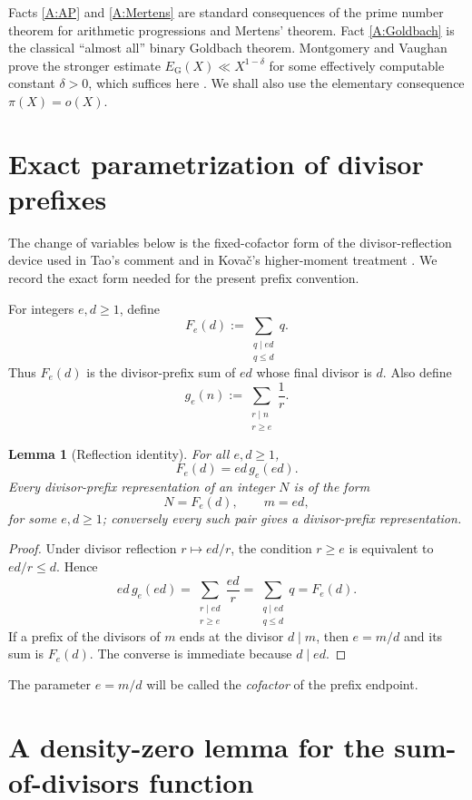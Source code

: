 \documentclass[11pt]{article}
\newtheorem{lemma}[theorem]{Lemma}
\theoremstyle{definition}
\theoremstyle{remark}
\begin{document}
Facts \ref{A:AP} and \ref{A:Mertens} are standard consequences of the prime number theorem for arithmetic progressions and Mertens' theorem.  Fact \ref{A:Goldbach} is the classical ``almost all'' binary Goldbach theorem.  Montgomery and Vaughan prove the stronger estimate $E_{\mathrm G}(X)\ll X^{1-\delta}$ for some effectively computable constant $\delta>0$, which suffices here \cite[Theorem~1]{MVGoldbach}.  We shall also use the elementary consequence $\pi(X)=o(X)$.

\section{Exact parametrization of divisor prefixes}

The change of variables below is the fixed-cofactor form of the
divisor-reflection device used in Tao's comment and in Kova\v{c}'s
higher-moment treatment \cite{TaoComment,Kovac}.  We record the exact
form needed for the present prefix convention.

For integers $e,d\geq1$, define
\[
F_e(d):=\sum_{\substack{q\mid ed\\q\leq d}}q.
\]
Thus $F_e(d)$ is the divisor-prefix sum of $ed$ whose final divisor is $d$.  Also define
\[
g_e(n):=\sum_{\substack{r\mid n\\r\geq e}}\frac1r.
\]

\begin{lemma}[Reflection identity]\label{lem:reflection}
For all $e,d\geq1$,
\[
F_e(d)=ed\,g_e(ed).
\]
Every divisor-prefix representation of an integer $N$ is of the form
\[
N=F_e(d),\qquad m=ed,
\]
for some $e,d\geq1$; conversely every such pair gives a divisor-prefix representation.
\end{lemma}

\begin{proof}
Under divisor reflection $r\mapsto ed/r$, the condition $r\geq e$ is equivalent to $ed/r\leq d$.  Hence
\[
ed\,g_e(ed)
=\sum_{\substack{r\mid ed\\r\geq e}}\frac{ed}{r}
=\sum_{\substack{q\mid ed\\q\leq d}}q
=F_e(d).
\]
If a prefix of the divisors of $m$ ends at the divisor $d\mid m$, then $e=m/d$ and its sum is $F_e(d)$.  The converse is immediate because $d\mid ed$.
\end{proof}

The parameter $e=m/d$ will be called the \emph{cofactor} of the prefix endpoint.

\section{A density-zero lemma for the sum-of-divisors function}
\end{document}
